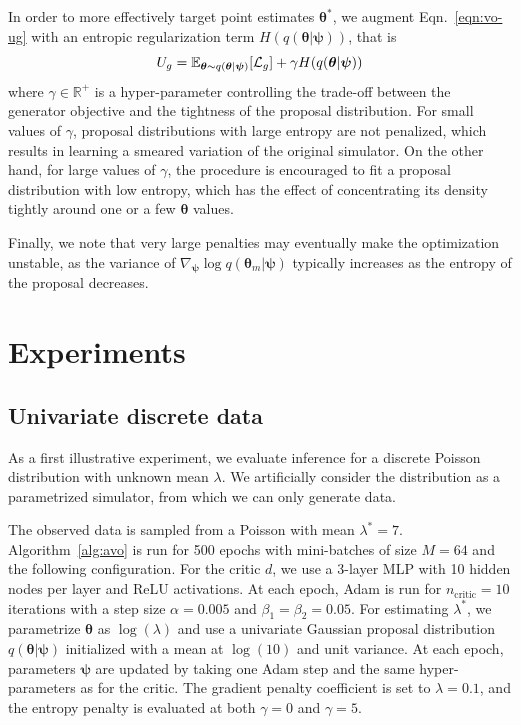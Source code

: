 \documentclass{article}
\newcommand{\bftheta}{{\bm \theta}}
\newcommand{\bfpsi}{{\bm \psi}}
\theoremstyle{plain}
\begin{document}
In order to more effectively target
point estimates $\bftheta^*$, we augment Eqn.~\ref{eqn:vo-ug} with
an entropic regularization term $H(q(\bftheta|\bfpsi))$, that is
\begin{equation}
U_g = \mathbb{E}_{\bftheta \sim q(\bftheta|\bfpsi)} [ {\cal L}_g ] + \gamma H(q(\bftheta|\bfpsi))
\end{equation}
where $\gamma \in \mathbb{R}^+$ is a hyper-parameter controlling the trade-off
between the generator objective and the tightness of the proposal distribution.
For small values of $\gamma$,
proposal distributions with large entropy are not penalized, which results
in learning a smeared variation of the original simulator. On the other hand,
for large values of $\gamma$, the procedure is encouraged to fit a proposal
distribution with low entropy, which has the effect of concentrating its density
tightly around one or a few $\bftheta$ values.

Finally, we note that very large penalties may
eventually make the optimization unstable, as the variance of $\nabla_\bfpsi \log q(\bftheta_m|\bfpsi)$
typically increases as the entropy of the proposal decreases.



\section{Experiments}

\subsection{Univariate discrete data}

As a first illustrative experiment, we evaluate inference for a discrete Poisson
distribution with unknown mean $\lambda$. We artificially consider
the distribution as a parametrized simulator, from which we can only
generate data.

The observed data is sampled from a Poisson with mean $\lambda^* = 7$.
Algorithm~\ref{alg:avo} is run for 500 epochs with mini-batches of size $M=64$
and the following configuration. For the critic $d$, we use a 3-layer MLP with 10
hidden nodes per layer and ReLU activations. At each epoch, Adam is run for
$n_\text{critic}=10$ iterations with a step size $\alpha=0.005$ and $\beta_1=\beta_2=0.05$.
For
estimating $\lambda^*$, we parametrize $\bftheta$ as $\log(\lambda)$ and use a univariate Gaussian proposal distribution
$q(\bftheta|\bfpsi)$ initialized with a mean at $\log(10)$ and unit variance. At
each epoch, parameters $\bfpsi$ are updated by taking one Adam step and the same hyper-parameters as for the critic.
The gradient penalty coefficient is set to
$\lambda=0.1$, and the entropy penalty is evaluated at both $\gamma=0$ and $\gamma=5$.
\end{document}
